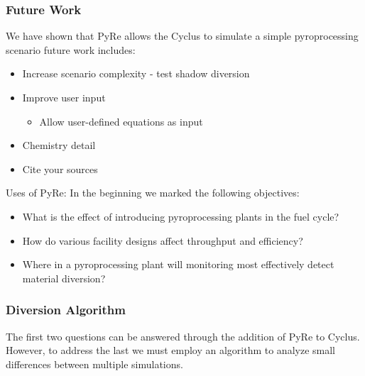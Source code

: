 \begin{frame}
  \frametitle{Future Work}
  We have shown that PyRe allows the Cyclus to simulate a simple pyroprocessing scenario future work includes:
  \begin{itemize}
     \item Increase scenario complexity - test shadow diversion
     \item Improve user input
     \begin{itemize}
      	\item Allow user-defined equations as input
     \end{itemize}
     \item Chemistry detail
     \item Cite your sources
  \end{itemize}
\begin{block}{Uses of PyRe:}
	In the beginning we marked the following objectives:
\begin{itemize}
	\item What is the effect of introducing pyroprocessing plants in the fuel cycle?
	\item How do various facility designs affect throughput and efficiency?
	\item Where in a pyroprocessing plant will monitoring most 
	effectively detect material diversion?
\end{itemize}
\end{block}
\end{frame}

\begin{frame}
\frametitle{Diversion Algorithm}
The first two questions can be answered through the addition of PyRe to Cyclus. However, to address the last we must 
employ an algorithm to analyze small differences between multiple simulations.
\end{frame}
